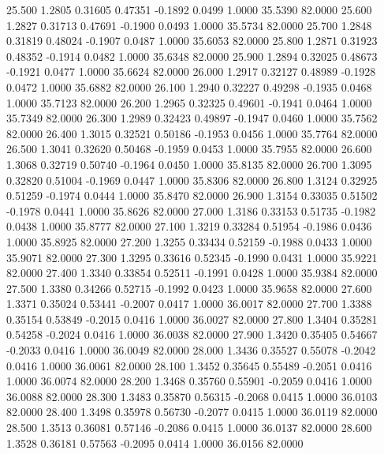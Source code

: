   25.500   1.2805   0.31605   0.47351  -0.1892   0.0499   1.0000  35.5390  82.0000
  25.600   1.2827   0.31713   0.47691  -0.1900   0.0493   1.0000  35.5734  82.0000
  25.700   1.2848   0.31819   0.48024  -0.1907   0.0487   1.0000  35.6053  82.0000
  25.800   1.2871   0.31923   0.48352  -0.1914   0.0482   1.0000  35.6348  82.0000
  25.900   1.2894   0.32025   0.48673  -0.1921   0.0477   1.0000  35.6624  82.0000
  26.000   1.2917   0.32127   0.48989  -0.1928   0.0472   1.0000  35.6882  82.0000
  26.100   1.2940   0.32227   0.49298  -0.1935   0.0468   1.0000  35.7123  82.0000
  26.200   1.2965   0.32325   0.49601  -0.1941   0.0464   1.0000  35.7349  82.0000
  26.300   1.2989   0.32423   0.49897  -0.1947   0.0460   1.0000  35.7562  82.0000
  26.400   1.3015   0.32521   0.50186  -0.1953   0.0456   1.0000  35.7764  82.0000
  26.500   1.3041   0.32620   0.50468  -0.1959   0.0453   1.0000  35.7955  82.0000
  26.600   1.3068   0.32719   0.50740  -0.1964   0.0450   1.0000  35.8135  82.0000
  26.700   1.3095   0.32820   0.51004  -0.1969   0.0447   1.0000  35.8306  82.0000
  26.800   1.3124   0.32925   0.51259  -0.1974   0.0444   1.0000  35.8470  82.0000
  26.900   1.3154   0.33035   0.51502  -0.1978   0.0441   1.0000  35.8626  82.0000
  27.000   1.3186   0.33153   0.51735  -0.1982   0.0438   1.0000  35.8777  82.0000
  27.100   1.3219   0.33284   0.51954  -0.1986   0.0436   1.0000  35.8925  82.0000
  27.200   1.3255   0.33434   0.52159  -0.1988   0.0433   1.0000  35.9071  82.0000
  27.300   1.3295   0.33616   0.52345  -0.1990   0.0431   1.0000  35.9221  82.0000
  27.400   1.3340   0.33854   0.52511  -0.1991   0.0428   1.0000  35.9384  82.0000
  27.500   1.3380   0.34266   0.52715  -0.1992   0.0423   1.0000  35.9658  82.0000
  27.600   1.3371   0.35024   0.53441  -0.2007   0.0417   1.0000  36.0017  82.0000
  27.700   1.3388   0.35154   0.53849  -0.2015   0.0416   1.0000  36.0027  82.0000
  27.800   1.3404   0.35281   0.54258  -0.2024   0.0416   1.0000  36.0038  82.0000
  27.900   1.3420   0.35405   0.54667  -0.2033   0.0416   1.0000  36.0049  82.0000
  28.000   1.3436   0.35527   0.55078  -0.2042   0.0416   1.0000  36.0061  82.0000
  28.100   1.3452   0.35645   0.55489  -0.2051   0.0416   1.0000  36.0074  82.0000
  28.200   1.3468   0.35760   0.55901  -0.2059   0.0416   1.0000  36.0088  82.0000
  28.300   1.3483   0.35870   0.56315  -0.2068   0.0415   1.0000  36.0103  82.0000
  28.400   1.3498   0.35978   0.56730  -0.2077   0.0415   1.0000  36.0119  82.0000
  28.500   1.3513   0.36081   0.57146  -0.2086   0.0415   1.0000  36.0137  82.0000
  28.600   1.3528   0.36181   0.57563  -0.2095   0.0414   1.0000  36.0156  82.0000
